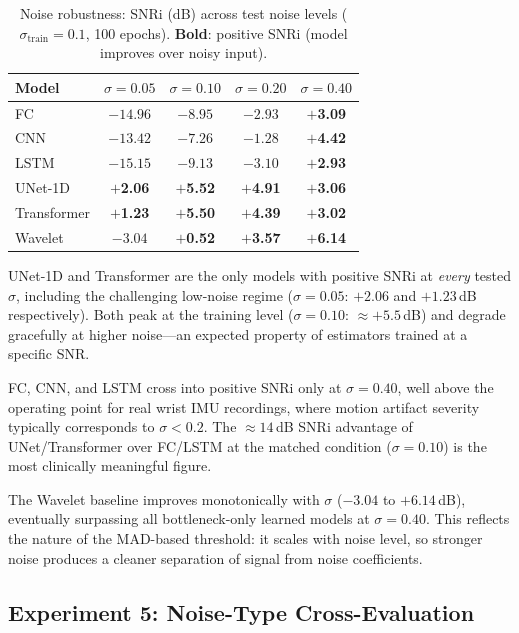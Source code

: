 \documentclass{article}
\begin{document}
\begin{table}[ht]
\caption{Noise robustness: SNRi (dB) across test noise levels
($\sigma_\text{train}=0.1$, 100 epochs).
\textbf{Bold}: positive SNRi (model improves over noisy input).}
\label{tab:noise-robust}
\begin{center}
\begin{tabular}{lcccc}
\toprule
\textbf{Model} & $\sigma=0.05$ & $\sigma=0.10$ & $\sigma=0.20$ & $\sigma=0.40$ \\
\midrule
FC          & $-14.96$ & $-8.95$ & $-2.93$ & $+$\textbf{3.09} \\
CNN         & $-13.42$ & $-7.26$ & $-1.28$ & $+$\textbf{4.42} \\
LSTM        & $-15.15$ & $-9.13$ & $-3.10$ & $+$\textbf{2.93} \\
UNet-1D     & $+$\textbf{2.06} & $+$\textbf{5.52} & $+$\textbf{4.91} & $+$\textbf{3.06} \\
Transformer & $+$\textbf{1.23} & $+$\textbf{5.50} & $+$\textbf{4.39} & $+$\textbf{3.02} \\
Wavelet     & $-3.04$ & $+$\textbf{0.52} & $+$\textbf{3.57} & $+$\textbf{6.14} \\
\bottomrule
\end{tabular}
\end{center}
\end{table}

UNet-1D and Transformer are the only models with positive SNRi at
\emph{every} tested $\sigma$, including the challenging low-noise regime
($\sigma=0.05$: $+2.06$ and $+1.23$\,dB respectively).
Both peak at the training level ($\sigma=0.10$: $\approx+5.5$\,dB) and
degrade gracefully at higher noise---an expected property of estimators
trained at a specific SNR.

FC, CNN, and LSTM cross into positive SNRi only at $\sigma=0.40$, well
above the operating point for real wrist IMU recordings, where motion artifact
severity typically corresponds to $\sigma<0.2$.
The $\approx14$\,dB SNRi advantage of UNet/Transformer over FC/LSTM at the
matched condition ($\sigma=0.10$) is the most clinically meaningful figure.

The Wavelet baseline improves monotonically with $\sigma$ ($-3.04$ to
$+6.14$\,dB), eventually surpassing all bottleneck-only learned models at
$\sigma=0.40$.
This reflects the nature of the MAD-based threshold: it scales with noise
level, so stronger noise produces a cleaner separation of signal from
noise coefficients.

\subsection{Experiment 5: Noise-Type Cross-Evaluation}
\label{sec:exp-noisetype}
\end{document}
